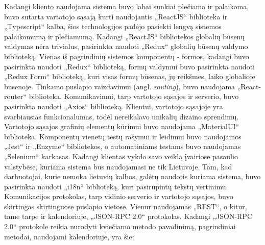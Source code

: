 \documentclass{VUMIFPSbakalaurinis}
\begin{document}
Kadangi kliento naudojama sistema buvo labai sunkiai plečiama ir palaikoma, buvo sutarta vartotojo sąsają kurti naudojantis „ReactJS“ biblioteka ir „Typescript“ kalba, šios technologijos padėjo pasiekti lengvą sistemos palaikomumą ir plečiamumą. Kadangi „ReactJS“ bibliotekos globalių būsenų valdymas nėra trivialus, pasirinkta naudoti „Redux“ globalių būsenų valdymo biblioteką. Vienas iš pagrindinių sistemos komponentų - formos, kadangi buvo pasirinkta naudoti „Redux“ biblioteką, formų valdymui buvo pasirinkta naudoti „Redux Form“ biblioteką, kuri visas formų būsenas, jų reikšmes, laiko globalioje būsenoje. Tinkamo puslapio vaizdavimui (angl. \textit{routing}), buvo naudojama „React-router“ biblioteka. Komunikavimui, tarp vartotojo sąsajos ir serverio, buvo pasirinkta naudoti „Axios“ biblioteką. Klientui, vartotojo sąsajoje yra svarbiausias funkcionalumas, todėl nereikalavo unikalių dizaino sprendimų. Vartotojo sąsajos grafinių elementų kūrimui buvo naudojama „MaterialUI“ biblioteka. Komponentų vienetų testų rašymui ir leidimui buvo naudojamos „Jest“ ir „Enzyme“ bibliotekos, o automatiniams testams buvo naudojamas „Selenium“ karkasas. Kadangi klientas vykdo savo veiklą įvairiose pasaulio valstybėse, kuriama sistema bus naudojamasi ne tik Lietuvoje. Tam, kad darbuotojai, kurie nemoka lietuvių kalbos, galėtų naudotis kuriama sistema, buvo pasirinkta naudoti „i18n“ biblioteką, kuri pasirūpintų tekstų vertinimu. Komunikacijos protokolas, tarp vidinio serverio ir vartotojo sąsajos, buvo skirtingas skirtinguose puslapio vietose. Vienur naudojamas „REST“, o kitur, tame tarpe ir kalendoriuje, „JSON-RPC 2.0“ protokolas. Kadangi „JSON-RPC 2.0“ protokole reikia nurodyti kviečiamo metodo pavadinimą, pagrindiniai metodai, naudojami kalendoriuje, yra šie: 
\end{document}
